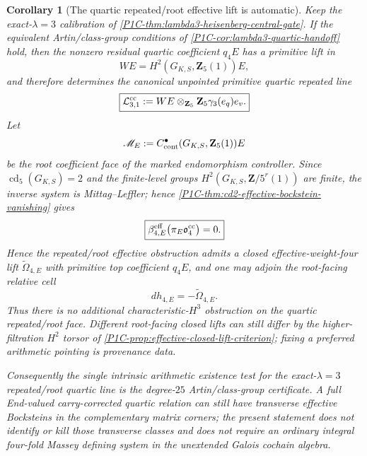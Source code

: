 \documentclass[11pt]{article}
\newtheorem{corollary}[theorem]{Corollary}
\theoremstyle{remark}
\newcommand{\Z}{\mathbf Z}
\begin{document}
\begin{corollary}[The quartic repeated/root effective lift is automatic]
\label{P1C-cor:lambda3-carry-compatible-quartic-line}
Keep the exact-$\lambda=3$ calibration of \cref{P1C-thm:lambda3-heisenberg-central-gate}.  If the equivalent
Artin/class-group conditions of \cref{P1C-cor:lambda3-quartic-handoff} hold, then the nonzero residual
quartic coefficient $q_4E$ has a primitive lift in
\[
 WE=H^2(G_{K,S},\Z_5(1))E,
\]
and therefore determines the canonical unpointed primitive quartic repeated line
\[
 \boxed{
 \mathcal L^{\rm cc}_{3,1}
 :=WE\otimes_{\Z_5}\Z_5\gamma_3(e_q)e_v.}
\]
Let
\[
 \mathscr M_E:=C^\bullet_{\rm cont}(G_{K,S},\Z_5(1))E
\]
be the root coefficient face of the marked endomorphism controller.  Since $\operatorname{cd}_5(G_{K,S})=2$ and the finite-level groups $H^2(G_{K,S},\Z/5^r(1))$ are finite, the inverse system is Mittag--Leffler; hence \cref{P1C-thm:cd2-effective-bockstein-vanishing} gives
\begin{equation}\label{P1C-eq:lambda3-effective-bockstein-gate}
 \boxed{
 \beta_{4,E}^{\rm eff}
 \bigl(\pi_E\mathfrak o_4^{\rm cc}\bigr)=0.}
\end{equation}
Hence the repeated/root effective obstruction admits a closed effective-weight-four lift
$\widetilde\Omega_{4,E}$ with primitive top coefficient $q_4E$, and one may adjoin the root-facing
relative cell
\[
 \boxed{dh_{4,E}=-\widetilde\Omega_{4,E}.}
\]
Thus there is no additional characteristic-$H^3$ obstruction on the quartic repeated/root face.
Different root-facing closed lifts can still differ by the higher-filtration $H^2$ torsor of
\cref{P1C-prop:effective-closed-lift-criterion}; fixing a preferred arithmetic pointing is provenance data.

Consequently the single intrinsic arithmetic existence test for the exact-$\lambda=3$ repeated/root
quartic line is the degree-$25$ Artin/class-group certificate.  A full End-valued carry-corrected
quartic relation can still have transverse effective Bocksteins in the complementary matrix corners;
the present statement does not identify or kill those transverse classes and does not require an
ordinary integral four-fold Massey defining system in the unextended Galois cochain algebra.
\end{corollary}
\end{document}
